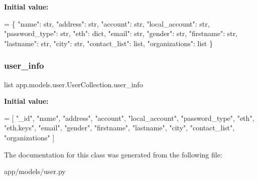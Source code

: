 {\bfseries Initial value\+:}
\begin{DoxyCode}
=  \{
        \textcolor{stringliteral}{"name"}: str,
        \textcolor{stringliteral}{"address"}: str,
        \textcolor{stringliteral}{"account"}: str,
        \textcolor{stringliteral}{"local\_account"}: str,
        \textcolor{stringliteral}{"password\_type"}: str,
        \textcolor{stringliteral}{"eth"}: dict,
        \textcolor{stringliteral}{"email"}: str,
        \textcolor{stringliteral}{"gender"}: str,
        \textcolor{stringliteral}{"firstname"}: str,
        \textcolor{stringliteral}{"lastname"}: str,
        \textcolor{stringliteral}{"city"}: str,
        \textcolor{stringliteral}{"contact\_list"}: list,
        \textcolor{stringliteral}{"organizations"}: list
    \}
\end{DoxyCode}
\mbox{\label{classapp_1_1models_1_1user_1_1_user_collection_a173addd961c46fd19ec6cd70bd4a5d3c}} 
\subsubsection{\texorpdfstring{user\+\_\+info}{user\_info}}
{\footnotesize\ttfamily list app.\+models.\+user.\+User\+Collection.\+user\+\_\+info\hspace{0.3cm}{\ttfamily [static]}}

{\bfseries Initial value\+:}
\begin{DoxyCode}
=  [
        \textcolor{stringliteral}{"\_id"},
        \textcolor{stringliteral}{"name"},
        \textcolor{stringliteral}{"address"},
        \textcolor{stringliteral}{"account"},
        \textcolor{stringliteral}{"local\_account"},
        \textcolor{stringliteral}{"password\_type"},
        \textcolor{stringliteral}{"eth"},
        \textcolor{stringliteral}{"eth.keys"},
        \textcolor{stringliteral}{"email"},
        \textcolor{stringliteral}{"gender"},
        \textcolor{stringliteral}{"firstname"},
        \textcolor{stringliteral}{"lastname"},
        \textcolor{stringliteral}{"city"},
        \textcolor{stringliteral}{"contact\_list"},
        \textcolor{stringliteral}{"organizations"}
    ]
\end{DoxyCode}


The documentation for this class was generated from the following file\+:\begin{DoxyCompactItemize}
\item 
app/models/user.\+py\end{DoxyCompactItemize}
